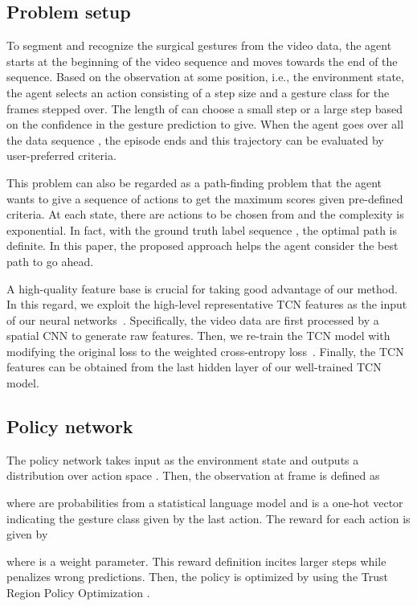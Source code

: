 \documentclass[letterpaper, 10 pt, conference]{ieeeconf}
\begin{document}
\subsection{Problem setup}

To segment and recognize the surgical gestures from the video data, the agent starts at the beginning of the video sequence  and moves towards the end of the sequence. Based on the observation at some position, i.e., the environment state, the agent selects an action  consisting of a step size  and a gesture class  for the frames stepped over. The length of  can choose a small step  or a large step  based on the confidence in the gesture prediction to give. When the agent goes over all the data sequence , the episode ends and this trajectory can be evaluated by user-preferred criteria.

This problem can also be regarded as a path-finding problem that the agent wants to give a sequence of actions to get the maximum scores given pre-defined criteria. At each state, there are  actions to be chosen from and the complexity is exponential. In fact, with the ground truth label sequence , the optimal path is definite. In this paper, the proposed approach helps the agent consider the best path to go ahead.

A high-quality feature base is crucial for taking good advantage of our method.
In this regard, we exploit the high-level representative TCN features as the input of our neural networks~\cite{lea2016temporal}. Specifically, the video data are first processed by a spatial CNN \cite{lea2016segmental} to generate raw features. 
Then, we re-train the TCN model with  modifying the original loss to the weighted cross-entropy loss~\cite{liu2018deep}. 
Finally, the TCN features  can be obtained from the last hidden layer of our well-trained TCN model.
	
\subsection{Policy network}

The policy network takes input as the environment state and outputs a distribution over action space \cite{liu2018deep}. Then, the observation at frame  is defined as

where  are probabilities from a statistical language model \cite{richard2016temporal} and  is a one-hot vector indicating the gesture class given by the last action. The reward for each action is given by

where  is a weight parameter. This reward definition incites larger steps while penalizes wrong predictions. Then, the policy is optimized by using the Trust Region Policy Optimization \cite{schulman2015trust}. 
\end{document}
